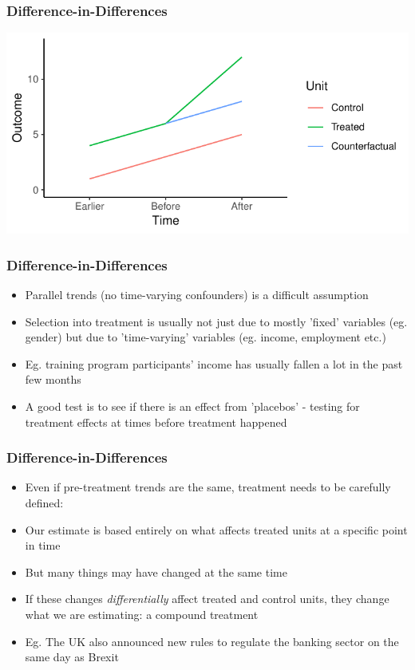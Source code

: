 \documentclass[xcolor=x11names,compress]{beamer}\usepackage[]{graphicx}\usepackage[]{color}
\makeatletter
\def\maxwidth{ %
  \ifdim\Gin@nat@width>\linewidth
    \linewidth
  \else
    \Gin@nat@width
  \fi
}
\newenvironment{knitrout}{}{} %
\renewcommand{\(}{\begin{columns}}
\renewcommand{\)}{\end{columns}}
\newcommand{\<}[1]{\begin{column}{#1}}
\renewcommand{\>}{\end{column}}
\makeatother
\begin{document}
\begin{frame}
\frametitle{Difference-in-Differences}
\begin{knitrout}
\color{fgcolor}
\includegraphics[width=\maxwidth]{figure/DinD_chart7-1} 

\end{knitrout}
\end{frame}

\begin{frame}
\frametitle{Difference-in-Differences}
\begin{itemize}
\item Parallel trends (no time-varying confounders) is a difficult assumption
\item Selection into treatment is usually not just due to mostly 'fixed' variables (eg. gender) but due to 'time-varying' variables (eg. income, employment etc.)
\item Eg. training program participants' income has usually fallen a lot in the past few months
\pause
\item A good test is to see if there is an effect from 'placebos' - testing for treatment effects at times before treatment happened
\end{itemize}
\end{frame}

\begin{frame}
\frametitle{Difference-in-Differences}
\begin{itemize}
\item Even if pre-treatment trends are the same, treatment needs to be carefully defined:
\pause
\item Our estimate is based entirely on what affects treated units at a specific point in time
\pause
\item But many things may have changed at the same time
\pause
\item If these changes \textit{differentially} affect treated and control units, they change what we are estimating: a compound treatment
\pause
\item Eg. The UK also announced new rules to regulate the banking sector on the same day as Brexit
\end{itemize}
\end{frame}
\end{document}
